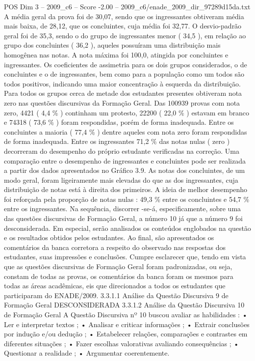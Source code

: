 \begin{textsample}{POS Dim 3 – 2009\_c6 – Score -2.00 – 2009\_c6/enade\_2009\_dir\_97289d15da.txt}
A média geral da prova foi de 30,07, sendo que os ingressantes obtiveram média mais baixa, de 28,12, que os concluintes, cuja média foi 32,77.
O desvio-padrão geral foi de 35,3, sendo o do grupo de ingressantes menor ( 34,5 ), em relação ao grupo dos concluintes ( 36,2 ), aqueles possuíram uma distribuição mais homogênea nas notas.
A nota máxima foi 100,0, atingida por concluintes e ingressantes.
Os coeficientes de assimetria para os dois grupos considerados, o de concluintes e o de ingressantes, bem como para a população como um todos são todos positivos, indicando uma maior concentração à esquerda da distribuição.
Para todos os grupos cerca de metade dos estudantes presentes obtiveram nota zero nas questões discursivas da Formação Geral.
Das 100939 provas com nota zero, 4421 ( 4,4 \% ) continham um protesto, 22200 ( 22,0 \% ) estavam em branco e 74318 ( 73,6 \% ) foram respondidas, porém de forma inadequada.
Entre os concluintes a maioria ( 77,4 \% ) dentre aqueles com nota zero foram respondidas de forma inadequada.
Entre os ingressantes 71,2 \% das notas nulas ( zero ) decorreram do desempenho do próprio estudante verificadas na correção.
Uma comparação entre o desempenho de ingressantes e concluintes pode ser realizada a partir dos dados apresentados no Gráfico 3.9.
As notas dos concluintes, de um modo geral, foram ligeiramente mais elevadas do que as dos ingressantes, cuja distribuição de notas está à direita dos primeiros.
A ideia de melhor desempenho foi reforçada pela proporção de notas nulas : 49,3 \% entre os concluintes e 54,7 \% entre os ingressantes.
Na sequência, discorrer -se-á, especificamente, sobre uma das questões discursivas de Formação Geral, a número 10 já que a número 9 foi desconsiderada.
Em especial, serão analisados os conteúdos englobados na questão e os resultados obtidos pelos estudantes.
Ao final, são apresentados os comentários da banca corretora a respeito do observado nas respostas dos estudantes, suas impressões e conclusões.
Cumpre esclarecer que, tendo em vista que as questões discursivas de Formação Geral foram padronizadas, ou seja, constam de todas as provas, os comentários da banca foram os mesmos para todas as áreas acadêmicas, eis que direcionados a todos os estudantes que participaram do ENADE/2009. 3.3.1.1 Análise da Questão Discursiva 9 de Formação Geral DESCONSIDERADA 3.3.1.2 Análise da Questão Discursiva 10 de Formação Geral A Questão Discursiva nº 10 buscou avaliar as habilidades : • Ler e interpretar textos ; • Analisar e criticar informações ; • Extrair conclusões por indução e/ou dedução ; • Estabelecer relações, comparações e contrastes em diferentes situações ; • Fazer escolhas valorativas avaliando consequências ; • Questionar a realidade ; • Argumentar coerentemente.

\end{textsample}
